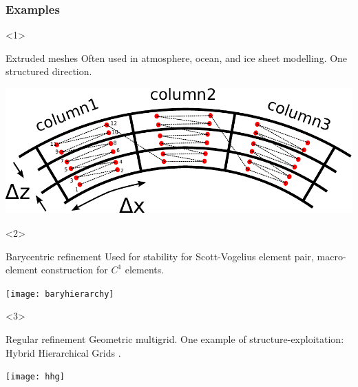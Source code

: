 \documentclass[presentation,aspectratio=43, 10pt]{beamer}
\begin{document}
\begin{frame}
  \frametitle{Examples}
  \begin{overlayarea}{\textwidth}{0.9\textheight}
    \begin{onlyenv}<1>
      \begin{block}{Extruded meshes}
        Often used in atmosphere, ocean, and ice sheet modelling. One
        structured direction.

        \begin{center}
          \includegraphics[height=0.4\textheight]{columndofs}
        \end{center}
      \end{block}
    \end{onlyenv}
    \begin{onlyenv}<2>
      \begin{block}{Barycentric refinement}
        Used for stability for Scott-Vogelius element pair,
        macro-element construction for $C^1$ elements.
        \begin{center}
          \texttt{[image: baryhierarchy]}
        \end{center}
      \end{block}
    \end{onlyenv}
    \begin{onlyenv}<3>
      \begin{block}{Regular refinement}
        Geometric multigrid. One example of structure-exploitation: Hybrid Hierarchical Grids \parencite{Bergen:2004}.
        \begin{center}
          \texttt{[image: hhg]}
        \end{center}
      \end{block}
    \end{onlyenv}
  \end{overlayarea}
\end{frame}
\end{document}
